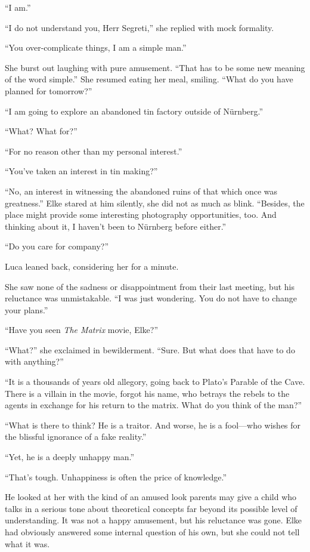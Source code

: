 ``I am.''

``I do not understand you, Herr Segreti,'' she replied with mock formality.

``You over-complicate things, I am a simple man.''

She burst out laughing with pure amusement. ``That has to be some new meaning of the word simple.'' She resumed eating her meal, smiling. ``What do you have planned for tomorrow?''

``I am going to explore an abandoned tin factory outside of Nürnberg.''

``What? What for?''

``For no reason other than my personal interest.''

``You've taken an interest in tin making?''

``No, an interest in witnessing the abandoned ruins of that which once was greatness.'' Elke stared at him silently, she did not as much as blink. ``Besides, the place might provide some interesting photography opportunities, too. And thinking about it, I haven't been to Nürnberg before either.''

``Do you care for company?''

Luca leaned back, considering her for a minute.

She saw none of the sadness or disappointment from their last meeting, but his reluctance was unmistakable. ``I was just wondering. You do not have to change your plans.''

``Have you seen \emph{The Matrix} movie, Elke?''

``What?'' she exclaimed in bewilderment. ``Sure. But what does that have to do with anything?''

``It is a thousands of years old allegory, going back to Plato's Parable of the Cave. There is a villain in the movie, forgot his name, who betrays the rebels to the agents in exchange for his return to the matrix. What do you think of the man?''

``What is there to think? He is a traitor. And worse, he is a fool---who wishes for the blissful ignorance of a fake reality.''

``Yet, he is a deeply unhappy man.''

``That's tough. Unhappiness is often the price of knowledge.''

He looked at her with the kind of an amused look parents may give a child who talks in a serious tone about theoretical concepts far beyond its possible level of understanding. It was not a happy amusement, but his reluctance was gone. Elke had obviously answered some internal question of his own, but she could not tell what it was.

